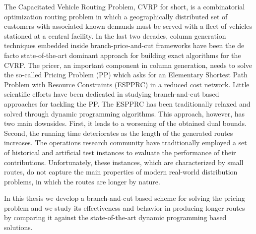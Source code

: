 \noindent The Capacitated Vehicle Routing Problem, CVRP for short,
is a combinatorial optimization routing problem in which
a geographically distributed set of
customers with associated known demands must be served with a fleet of vehicles
stationed at a central facility.
In the last two decades,
column generation techniques embedded inside branch-price-and-cut frameworks
have been the de facto state-of-the-art dominant approach
for building exact algorithms for the CVRP.
The pricer, an important component in column generation, needs to solve
the so-called Pricing Problem (PP) which asks for an
Elementary Shortest Path Problem with Resource Constraints (ESPPRC)
in a reduced cost network.
Little scientific efforts have been dedicated in studying
branch-and-cut based approaches for tackling the PP.
The ESPPRC has been traditionally relaxed and solved through dynamic programming
algorithms. This approach, however, has two main downsides.
First, it leads to a worsening of the obtained dual bounds.
Second, the running time deteriorates as
the length of the generated routes increases.
The operations research community have traditionally employed
a set of historical and artificial test instances to evaluate
the performance of their contributions.
Unfortunately, these instances, which are characterized by small routes,
do not capture the main properties of modern real-world distribution
problems, in which the routes are longer by nature.

\noindent In this thesis we develop
a branch-and-cut based scheme for solving the pricing problem
and we study its effectiveness and behavior in producing longer routes
by comparing it against the state-of-the-art dynamic programming based solutions.
